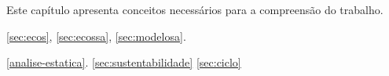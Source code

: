 \label{fundamentacao}

Este capítulo apresenta conceitos necessários para a compreensão do trabalho.

\ref{sec:ecos}, \ref{sec:ecossa}, \ref{sec:modelosa}.

\ref{analise-estatica}.
\ref{sec:sustentabilidade}
\ref{sec:ciclo}





